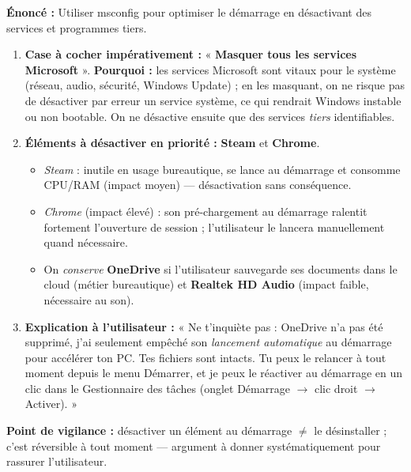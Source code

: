 \documentclass[11pt]{article}
\begin{document}
\begin{corrige}
\textbf{Énoncé :} Utiliser msconfig pour optimiser le démarrage en désactivant des services et programmes tiers.
\tcblower
\begin{enumerate}
    \item \textbf{Case à cocher impérativement :} « \textbf{Masquer tous les services Microsoft} ». \textbf{Pourquoi :} les services Microsoft sont vitaux pour le système (réseau, audio, sécurité, Windows Update) ; en les masquant, on ne risque pas de désactiver par erreur un service système, ce qui rendrait Windows instable ou non bootable. On ne désactive ensuite que des services \emph{tiers} identifiables.
    \item \textbf{Éléments à désactiver en priorité :} \textbf{Steam} et \textbf{Chrome}.
    \begin{itemize}
        \item \emph{Steam} : inutile en usage bureautique, se lance au démarrage et consomme CPU/RAM (impact moyen) — désactivation sans conséquence.
        \item \emph{Chrome} (impact élevé) : son pré-chargement au démarrage ralentit fortement l'ouverture de session ; l'utilisateur le lancera manuellement quand nécessaire.
        \item On \emph{conserve} \textbf{OneDrive} si l'utilisateur sauvegarde ses documents dans le cloud (métier bureautique) et \textbf{Realtek HD Audio} (impact faible, nécessaire au son).
    \end{itemize}
    \item \textbf{Explication à l'utilisateur :} « Ne t'inquiète pas : OneDrive n'a pas été supprimé, j'ai seulement empêché son \emph{lancement automatique} au démarrage pour accélérer ton PC. Tes fichiers sont intacts. Tu peux le relancer à tout moment depuis le menu Démarrer, et je peux le réactiver au démarrage en un clic dans le Gestionnaire des tâches (onglet Démarrage $\rightarrow$ clic droit $\rightarrow$ Activer). »
\end{enumerate}

\textbf{Point de vigilance :} désactiver un élément au démarrage $\neq$ le désinstaller ; c'est réversible à tout moment — argument à donner systématiquement pour rassurer l'utilisateur.
\end{corrige}
\end{document}
